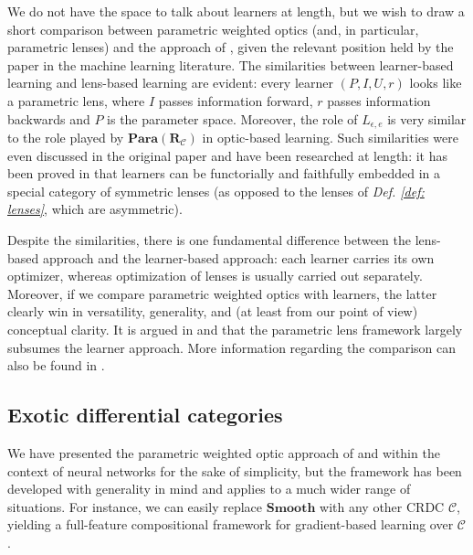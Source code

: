 \documentclass[11pt,a4paper,openright,twoside]{report}
\theoremstyle{plain}
\theoremstyle{definition}
\begin{document}
We do not have the space to talk about learners at length, but we wish to draw a short comparison between parametric weighted optics (and, in particular, parametric lenses) and the approach of \cite{fong2019backprop}, given the relevant position held by the paper in the machine learning literature. The similarities between learner-based learning and lens-based learning are evident: every learner $(P, I, U, r)$ looks like a parametric lens, where $I$ passes information forward, $r$ passes information backwards and $P$ is the parameter space. Moreover, the role of $L_{\epsilon, e}$ is very similar to the role played by $\mathbf{Para}(\mathbf{R}_{\mathcal{C}})$ in optic-based learning. Such similarities were even discussed in the original paper \cite{fong2019backprop} and have been researched at length: it has been proved in \cite{fong2019lenses} that learners can be functorially and faithfully embedded in a special category of symmetric lenses (as opposed to the lenses of \textit{Def. \ref{def: lenses}}, which are asymmetric).


Despite the similarities, there is one fundamental difference between the lens-based approach and the learner-based approach: each learner carries its own optimizer, whereas optimization of lenses is usually carried out separately. Moreover, if we compare parametric weighted optics with learners, the latter clearly win in versatility, generality, and (at least from our point of view) conceptual clarity. It is argued in \cite{shiebler2021category} and \cite{cruttwell2022categorical} that the parametric lens framework largely subsumes the learner approach. More information regarding the comparison can also be found in \cite{gavranovic2024fundamental}.


\subsection{Exotic differential categories}

We have presented the parametric weighted optic approach of \cite{gavranovic2024fundamental} and \cite{cruttwell2022categorical} within the context of neural networks for the sake of simplicity, but the framework has been developed with generality in mind and applies to a much wider range of situations. For instance, we can easily replace $\mathbf{Smooth}$ with any other CRDC $\mathcal{C}$, yielding a full-feature compositional framework for gradient-based learning over $\mathcal{C}$.
\end{document}
